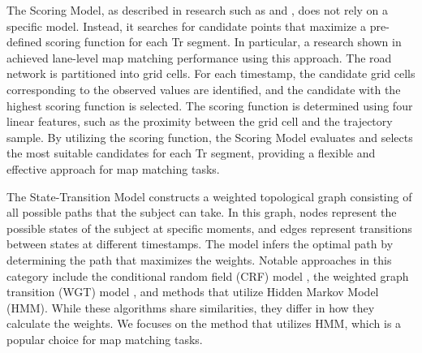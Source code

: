 \documentclass[preprint,12pt]{elsarticle}
\begin{document}
The Scoring Model, as described in research such as \cite{quddus2015shortest} and \cite{sharath2019dynamic}, does not rely on a specific model. Instead, it searches for candidate points that maximize a pre-defined scoring function for each Tr segment. In particular, a research shown in \cite{sharath2019dynamic} achieved lane-level map matching performance using this approach.
The road network is partitioned into grid cells. For each timestamp, the candidate grid cells corresponding to the observed values are identified, and the candidate with the highest scoring function is selected. The scoring function is determined using four linear features, such as the proximity between the grid cell and the trajectory sample.
By utilizing the scoring function, the Scoring Model evaluates and selects the most suitable candidates for each Tr segment, providing a flexible and effective approach for map matching tasks.

The State-Transition Model constructs a weighted topological graph consisting of all possible paths that the subject can take. In this graph, nodes represent the possible states of the subject at specific moments, and edges represent transitions between states at different timestamps. The model infers the optimal path by determining the path that maximizes the weights. Notable approaches in this category include the conditional random field (CRF) model \cite{hunter2013path}, the weighted graph transition (WGT) model \cite{hu2016if, lou2009map}, and methods that utilize Hidden Markov Model (HMM).
While these algorithms share similarities, they differ in how they calculate the weights. We focuses on the method that utilizes HMM, which is a popular choice for map matching tasks.
\end{document}
